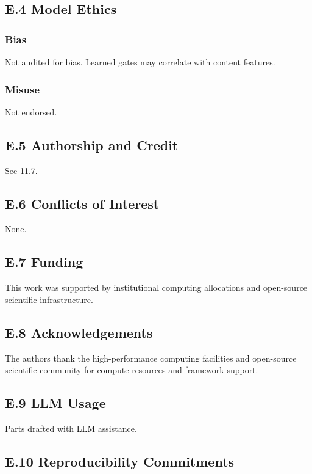 \subsection{E.4 Model Ethics}

\subsubsection{Bias}
Not audited for bias. Learned gates may correlate with content features.

\subsubsection{Misuse}
Not endorsed.

\subsection{E.5 Authorship and Credit}

See  11.7.

\subsection{E.6 Conflicts of Interest}

None.

\subsection{E.7 Funding}

This work was supported by institutional computing allocations and open-source scientific infrastructure.

\subsection{E.8 Acknowledgements}

The authors thank the high-performance computing facilities and open-source scientific community for compute resources and framework support.

\subsection{E.9 LLM Usage}

Parts drafted with LLM assistance.

\subsection{E.10 Reproducibility Commitments}

